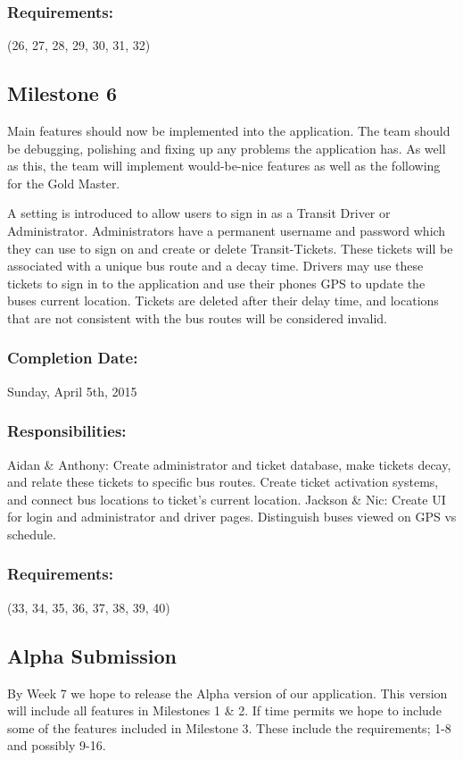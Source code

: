 \documentclass[a4paper,12pt]{article}
\begin{document}
\subsubsection{Requirements:} (26, 27, 28, 29, 30, 31, 32)

\subsection{Milestone 6}
Main features should now be implemented into the application. The team should be debugging, polishing and fixing up any problems the application has. As well as this, the team will implement would-be-nice features as well as the following for the Gold Master.

A setting is introduced to allow users to sign in as a Transit Driver or Administrator. Administrators have a permanent username and password which they can use to sign on and create or delete Transit-Tickets. These tickets will be associated with a unique bus route and a decay time. Drivers may use these tickets to sign in to the application and use their phones GPS to update the buses current location. Tickets are deleted after their delay time, and locations that are not consistent with the bus routes will be considered invalid. 
\subsubsection{Completion Date:} Sunday, April 5th, 2015
\subsubsection{Responsibilities:}
Aidan \& Anthony: Create administrator and ticket database, make tickets decay, and relate these tickets to specific bus routes. Create ticket activation systems, and connect bus locations to ticket’s current location.
Jackson \& Nic: Create UI for login and administrator and driver pages. Distinguish buses viewed on GPS vs schedule.
\subsubsection{Requirements:} (33, 34, 35, 36, 37, 38, 39, 40)
\pagebreak
\subsection{Alpha Submission}
By Week 7 we hope to release the Alpha
version of our application. This version will include all features in Milestones 1 \& 2. If time permits we hope to include some of the features included in Milestone 3. These include the requirements; 1-8 and possibly 9-16. 
\end{document}
